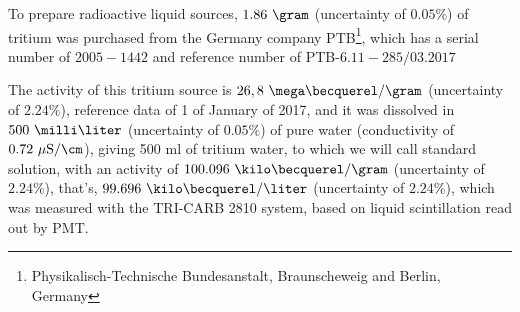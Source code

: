To prepare radioactive liquid sources, $1.86~\gram$ (uncertainty of $0.05\%$) of tritium was purchased from the Germany company PTB\footnote{Physikalisch-Technische Bundesanstalt, Braunscheweig and Berlin, Germany}, which has a serial number of $2005-1442$ and reference number of PTB-$6.11-285/03.2017$ \cite{TritiumSourceTechnicalFile}


The activity of this tritium source is $26,8~\mega\becquerel/\gram$ (uncertainty of $2.24\%$), reference data of 1 of January of 2017, and it was dissolved in $500~\milli\liter$ (uncertainty of $0.05\%$) of pure water (conductivity of $0.72~\mu\text{S}/\cm$), giving 500 ml of tritium water, to which we will call standard solution, with an activity of $100.096~\kilo\becquerel/\gram$ (uncertainty of $2.24\%$), that's, $99.696~\kilo\becquerel/\liter$ (uncertainty of $2.24\%$), which was measured with the TRI-CARB 2810 system, based on liquid scintillation read out by PMT.